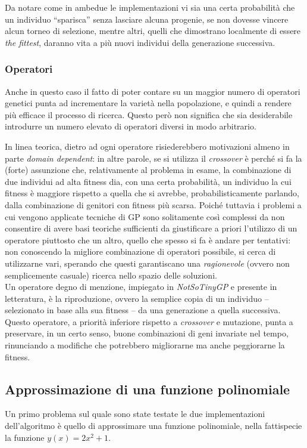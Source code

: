\documentclass{../llncs}
\begin{document}
Da notare come in ambedue le implementazioni vi sia una certa probabilità che un individuo ``sparisca'' senza lasciare alcuna progenie, se non dovesse vincere alcun torneo di selezione, mentre altri, quelli che dimostrano localmente di essere \emph{the fittest}, daranno vita a più nuovi individui della generazione successiva.

\subsubsection{Operatori}
Anche in questo caso il fatto di poter contare su un maggior numero di operatori genetici punta ad incrementare la varietà nella popolazione, e quindi a rendere più efficace il processo di ricerca. Questo però non significa che sia desiderabile introdurre un numero elevato di operatori diversi in modo arbitrario.

In linea teorica, dietro ad ogni operatore risiederebbero motivazioni almeno in parte \emph{domain dependent}: in altre parole, se si utilizza il \emph{crossover} è perché si fa la (forte) assunzione che, relativamente al problema in esame, la combinazione di due individui ad alta fitness dia, con una certa probabilità, un individuo la cui fitness è maggiore rispetto a quella che si avrebbe, probabilisticamente parlando, dalla combinazione di genitori con fitness più scarsa.
Poiché tuttavia i problemi a cui vengono applicate tecniche di GP sono solitamente così complessi da non consentire di avere basi teoriche sufficienti da giustificare a priori l'utilizzo di un operatore piuttosto che un altro, quello che spesso si fa è andare per tentativi: non conoscendo la migliore combinazione di operatori possibile, si cerca di utilizzarne vari, sperando che questi garantiscano una \emph{ragionevole} (ovvero non semplicemente casuale) ricerca nello spazio delle soluzioni.\\

Un operatore degno di menzione, impiegato in \emph{NotSoTinyGP} e presente in letteratura, è la riproduzione, ovvero la semplice copia di un individuo -- selezionato in base alla sua fitness -- da una generazione a quella successiva. Questo operatore, a priorità inferiore rispetto a \emph{crossover} e mutazione, punta a preservare, in un certo senso, buone combinazioni di geni invariate nel tempo, rinunciando a modifiche che potrebbero migliorarne ma anche peggiorarne la fitness.

\subsection{Approssimazione di una funzione polinomiale}
Un primo problema sul quale sono state testate le due implementazioni dell'algoritmo è quello di approssimare una funzione polinomiale, nella fattispecie la funzione $y(x)=2x^2+1$.
\end{document}

